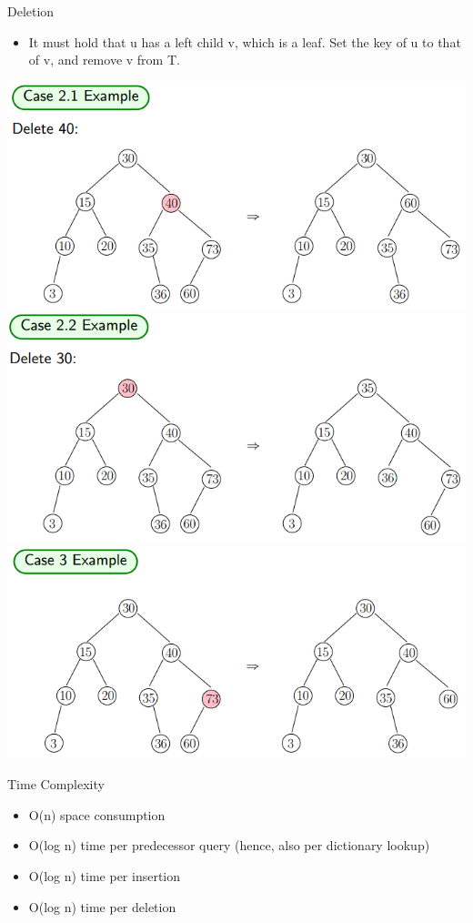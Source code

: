 \documentclass{lecture}
\begin{document}
\begin{landscape}
\begin{multicols}{2}
\begin{note}{Deletion}
\begin{itemize}[nolistsep]
                \begin{itemize}[nolistsep]
                    \item It must hold that u has a left child v, which is a leaf. Set the key of u to that of v, and remove v from T.
                \end{itemize}
        \end{itemize}
    \end{note}
    \vfill
    \includegraphics[width=\linewidth]{case21}
    \vfill
    \includegraphics[width=\linewidth]{case22}
    \vfill
    \includegraphics[width=\linewidth]{case3}
    \vfill
    \begin{note}{Time Complexity}
        \begin{itemize}[nolistsep]
            \item O(n) space consumption
            \item O(log n) time per predecessor query (hence, also per dictionary lookup)
            \item O(log n) time per insertion
            \item O(log n) time per deletion
        \end{itemize}
    \end{note}


\end{multicols}
\end{landscape}
\end{document}
